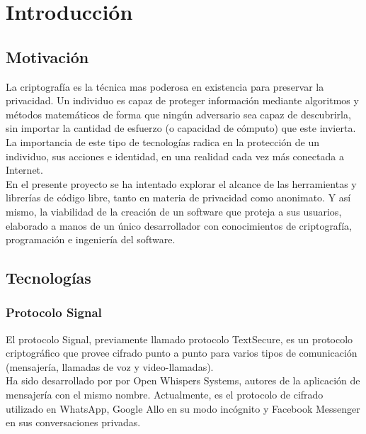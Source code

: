\chapter{Introducción}

\section {Motivación}

La criptografía es la técnica mas poderosa en existencia para preservar la privacidad. Un individuo es capaz de proteger información mediante algoritmos y métodos matemáticos de forma que ningún adversario sea capaz de descubrirla, sin importar la cantidad de esfuerzo (o capacidad de cómputo) que este invierta. \\

La importancia de este tipo de tecnologías radica en la protección de un individuo, sus acciones e identidad, en una realidad cada vez más conectada a Internet. \\

En el presente proyecto se ha intentado explorar el alcance de las herramientas y librerías de código libre, tanto en materia de privacidad como anonimato. Y así mismo, la viabilidad de la creación de un software que proteja a sus usuarios, elaborado a manos de un único desarrollador con conocimientos de criptografía, programación e ingeniería del software.


\section {Tecnologías}
\subsection {Protocolo Signal}

El protocolo Signal, previamente llamado protocolo TextSecure, es un protocolo criptográfico que provee cifrado punto a punto para varios tipos de comunicación (mensajería, llamadas de voz y video-llamadas). \\

Ha sido desarrollado por por Open Whispers Systems, autores de la aplicación de mensajería con el mismo nombre. Actualmente, es el protocolo de cifrado utilizado en WhatsApp, Google Allo en su modo incógnito y Facebook Messenger en sus conversaciones privadas. \\

